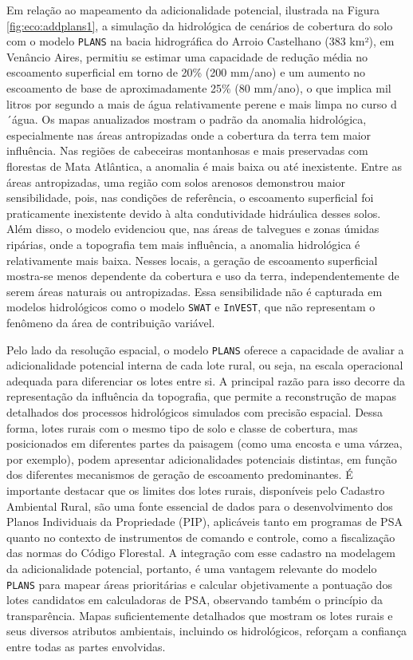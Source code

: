 \documentclass[./main.tex]{subfiles}
\begin{document}
\par Em relação ao mapeamento da adicionalidade potencial, ilustrada na Figura \ref{fig:eco:addplans1}, a simulação da hidrológica de cenários de cobertura do solo com o modelo \texttt{PLANS} na bacia hidrográfica do Arroio Castelhano (383 km²), em Venâncio Aires, permitiu se estimar uma capacidade de redução média no escoamento superficial em torno de 20\% (200 mm/ano) e um aumento no escoamento de base de aproximadamente 25\% (80 mm/ano), o que implica mil litros por segundo a mais de água relativamente perene e mais limpa no curso d´água. Os mapas anualizados mostram o padrão da anomalia hidrológica, especialmente nas áreas antropizadas onde a cobertura da terra tem maior influência. Nas regiões de cabeceiras montanhosas e mais preservadas com florestas de Mata Atlântica, a anomalia é mais baixa ou até inexistente. Entre as áreas antropizadas, uma região com solos arenosos demonstrou maior sensibilidade, pois, nas condições de referência, o escoamento superficial foi praticamente inexistente devido à alta condutividade hidráulica desses solos. Além disso, o modelo evidenciou que, nas áreas de talvegues e zonas úmidas ripárias, onde a topografia tem mais influência, a anomalia hidrológica é relativamente mais baixa. Nesses locais, a geração de escoamento superficial mostra-se menos dependente da cobertura e uso da terra, independentemente de serem áreas naturais ou antropizadas. Essa sensibilidade não é capturada em modelos hidrológicos como o modelo \texttt{SWAT} e \texttt{InVEST}, que não representam o fenômeno da área de contribuição variável.

\par Pelo lado da resolução espacial, o modelo \texttt{PLANS} oferece a capacidade de avaliar a adicionalidade potencial interna de cada lote rural, ou seja, na escala operacional adequada para diferenciar os lotes entre si. A principal razão para isso decorre da representação da influência da topografia, que permite a reconstrução de mapas detalhados dos processos hidrológicos simulados com precisão espacial. Dessa forma, lotes rurais com o mesmo tipo de solo e classe de cobertura, mas posicionados em diferentes partes da paisagem (como uma encosta e uma várzea, por exemplo), podem apresentar adicionalidades potenciais distintas, em função dos diferentes mecanismos de geração de escoamento predominantes. É importante destacar que os limites dos lotes rurais, disponíveis pelo Cadastro Ambiental Rural, são uma fonte essencial de dados para o desenvolvimento dos Planos Individuais da Propriedade (PIP), aplicáveis tanto em programas de PSA quanto no contexto de instrumentos de comando e controle, como a fiscalização das normas do Código Florestal. A integração com esse cadastro na modelagem da adicionalidade potencial, portanto, é uma vantagem relevante do modelo \texttt{PLANS} para mapear áreas prioritárias e calcular objetivamente a pontuação dos lotes candidatos em calculadoras de PSA, observando também o princípio da transparência. Mapas suficientemente detalhados que mostram os lotes rurais e seus diversos atributos ambientais, incluindo os hidrológicos, reforçam a confiança entre todas as partes envolvidas. 
\end{document}
